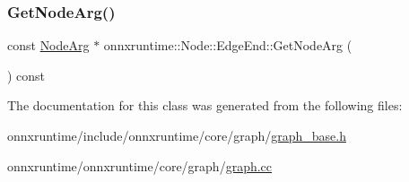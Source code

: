 \subsubsection{\texorpdfstring{Get\+Node\+Arg()}{GetNodeArg()}}
{\footnotesize\ttfamily const \mbox{\hyperlink{classonnxruntime_1_1NodeArg}{Node\+Arg}} $\ast$ onnxruntime\+::\+Node\+::\+Edge\+End\+::\+Get\+Node\+Arg (\begin{DoxyParamCaption}{ }\end{DoxyParamCaption}) const\hspace{0.3cm}{\ttfamily [noexcept]}}



The documentation for this class was generated from the following files\+:\begin{DoxyCompactItemize}
\item 
onnxruntime/include/onnxruntime/core/graph/\mbox{\hyperlink{graph__base_8h}{graph\+\_\+base.\+h}}\item 
onnxruntime/onnxruntime/core/graph/\mbox{\hyperlink{graph_8cc}{graph.\+cc}}\end{DoxyCompactItemize}
